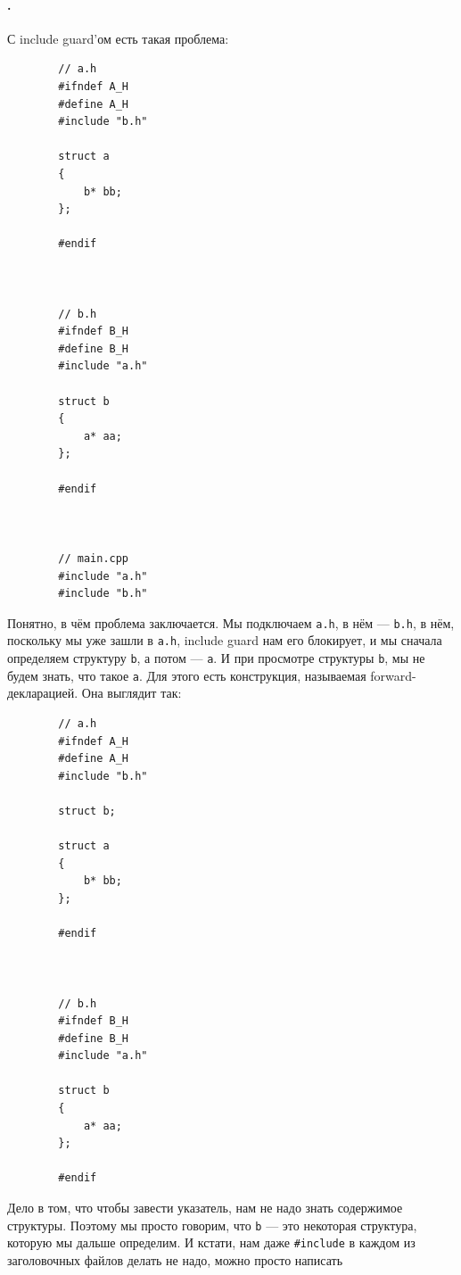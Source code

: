 \documentclass{article}
\begin{document}
    \paragraph{.}
    С include guard'ом есть такая проблема:
    \begin{verbatim}
        // a.h
        #ifndef A_H
        #define A_H
        #include "b.h"
        
        struct a
        {
            b* bb;
        };
        
        #endif



        // b.h
        #ifndef B_H
        #define B_H
        #include "a.h"
        
        struct b
        {
            a* aa;
        };
        
        #endif



        // main.cpp
        #include "a.h"
        #include "b.h"
    \end{verbatim}
    Понятно, в чём проблема заключается. Мы подключаем \texttt{a.h}, в нём --- \texttt{b.h}, в нём, поскольку мы уже зашли в \texttt{a.h}, include guard нам его блокирует, и мы сначала определяем структуру \texttt{b}, а потом --- \texttt{a}. И при просмотре структуры \texttt{b}, мы не будем знать, что такое \texttt{a}. Для этого есть конструкция, называемая forward-декларацией. Она выглядит так:
    \begin{verbatim}
        // a.h
        #ifndef A_H
        #define A_H
        #include "b.h"

        struct b;

        struct a
        {
            b* bb;
        };

        #endif



        // b.h
        #ifndef B_H
        #define B_H
        #include "a.h"

        struct b
        {
            a* aa;
        };

        #endif
    \end{verbatim}
    Дело в том, что чтобы завести указатель, нам не надо знать содержимое структуры. Поэтому мы просто говорим, что \texttt{b} --- это некоторая структура, которую мы дальше определим. И кстати, нам даже \texttt{#include} в каждом из заголовочных файлов делать не надо, можно просто написать
\end{document}
